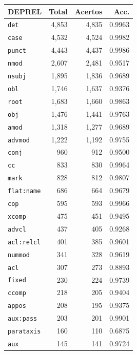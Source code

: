 
\begin{table}[ht]
\centering
\footnotesize
\begin{tabular}{lrrr}
\toprule
\textbf{DEPREL} & \textbf{Total} & \textbf{Acertos} & \textbf{Acc.} \\
\midrule
\texttt{det} & 4,853 & 4,835 & 0.9963 \\
\texttt{case} & 4,532 & 4,524 & 0.9982 \\
\texttt{punct} & 4,443 & 4,437 & 0.9986 \\
\texttt{nmod} & 2,607 & 2,481 & 0.9517 \\
\texttt{nsubj} & 1,895 & 1,836 & 0.9689 \\
\texttt{obl} & 1,746 & 1,637 & 0.9376 \\
\texttt{root} & 1,683 & 1,660 & 0.9863 \\
\texttt{obj} & 1,476 & 1,441 & 0.9763 \\
\texttt{amod} & 1,318 & 1,277 & 0.9689 \\
\texttt{advmod} & 1,222 & 1,192 & 0.9755 \\
\texttt{conj} & 960 & 912 & 0.9500 \\
\texttt{cc} & 833 & 830 & 0.9964 \\
\texttt{mark} & 828 & 812 & 0.9807 \\
\texttt{flat\!:\!name} & 686 & 664 & 0.9679 \\
\texttt{cop} & 595 & 593 & 0.9966 \\
\texttt{xcomp} & 475 & 451 & 0.9495 \\
\texttt{advcl} & 437 & 405 & 0.9268 \\
\texttt{acl\!:\!relcl} & 401 & 385 & 0.9601 \\
\texttt{nummod} & 341 & 328 & 0.9619 \\
\texttt{acl} & 307 & 273 & 0.8893 \\
\texttt{fixed} & 230 & 224 & 0.9739 \\
\texttt{ccomp} & 218 & 205 & 0.9404 \\
\texttt{appos} & 208 & 195 & 0.9375 \\
\texttt{aux\!:\!pass} & 203 & 201 & 0.9901 \\
\texttt{parataxis} & 160 & 110 & 0.6875 \\
\texttt{aux} & 145 & 141 & 0.9724 \\

\end{tabular}
\end{table}
